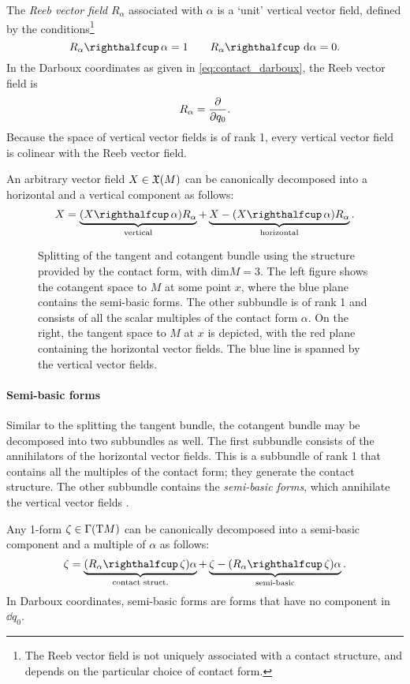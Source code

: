 The \emph{Reeb vector field} $R_\alpha$ associated with $\alpha$ is a `unit' vertical vector field, defined by the conditions\footnote{The Reeb vector field is not uniquely associated with a contact structure, and depends on the particular choice of contact form.}
    $$ \intpr{R_\alpha}{\alpha} = 1 \qquad \intpr{R_\alpha}{\dd{\alpha}} = 0.$$
In the Darboux coordinates as given in \cref{eq:contact_darboux}, the Reeb vector field is
    $$ R_\alpha = \pdv{}{q_0}. $$ 
Because the space of vertical vector fields is of rank 1, every vertical vector field is colinear with the Reeb vector field.

An arbitrary vector field $X \in \mathfrak{X}\qty(M)$ can be canonically decomposed into a horizontal and a vertical component as follows:
\begin{equation}
    X = \underbrace{(\intpr{X}{\alpha})R_\alpha}_\text{vertical} + \underbrace{X - (\intpr{X}{\alpha})R_\alpha}_\text{horizontal}.
    \label{eq:vfield_splitting}
\end{equation}

\begin{figure}[ht!]
    \centering
    
    \caption{Splitting of the tangent and cotangent bundle using the structure provided by the contact form, with $\text{dim} M = 3$. The left figure shows the cotangent space to $M$ at some point $x$, where the blue plane contains the semi-basic forms. The other subbundle is of rank 1 and consists of all the scalar multiples of the contact form $\alpha$. On the right, the tangent space to $M$ at $x$ is depicted, with the red plane containing the horizontal vector fields. The blue line is spanned by the vertical vector fields.}
    \label{fig:contact_spaces}
\end{figure}

\paragraph{Semi-basic forms} Similar to the splitting the tangent bundle, the cotangent bundle may be decomposed into two subbundles as well. The first subbundle consists of the annihilators of the horizontal vector fields. This is a subbundle of rank 1 that contains all the multiples of the contact form; they generate the contact structure. The other subbundle contains the \emph{semi-basic forms}, which annihilate the vertical vector fields \cite{Libermann1987}.

Any 1-form $\zeta \in \mathrm{\Gamma}\qty(\mathrm{T}M)$ can be canonically decomposed into a semi-basic component and a multiple of $\alpha$ as follows:
\begin{equation}
    \zeta = \underbrace{(\intpr{R_\alpha}{\zeta})\alpha}_\text{contact struct.} + \underbrace{\zeta - (\intpr{R_\alpha}{\zeta})\alpha}_\text{semi-basic}. 
    \label{eq:form_splitting}
\end{equation}
In Darboux coordinates, semi-basic forms are forms that have no component in $\dd{q_0}$.

